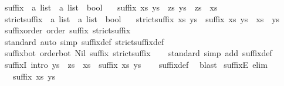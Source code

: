 \begin{isabellebody}
\ suffix\ {\isacharcolon}{\isacharcolon}\ {\isachardoublequoteopen}{\isacharprime}a\ list\ {\isasymRightarrow}\ {\isacharprime}a\ list\ {\isasymRightarrow}\ bool{\isachardoublequoteclose}\isanewline
\ \ \ {\isachardoublequoteopen}suffix\ xs\ ys\ {\isacharequal}\ {\isacharparenleft}{\isasymexists}zs{\isachardot}\ ys\ {\isacharequal}\ zs\ {\isacharat}\ xs{\isacharparenright}{\isachardoublequoteclose}\isanewline
\isanewline
{}\isamarkupfalse%
\ strict{\isacharunderscore}suffix\ {\isacharcolon}{\isacharcolon}\ {\isachardoublequoteopen}{\isacharprime}a\ list\ {\isasymRightarrow}\ {\isacharprime}a\ list\ {\isasymRightarrow}\ bool{\isachardoublequoteclose}\isanewline
\ \ \ {\isachardoublequoteopen}strict{\isacharunderscore}suffix\ xs\ ys\ {\isasymlongleftrightarrow}\ suffix\ xs\ ys\ {\isasymand}\ xs\ {\isasymnoteq}\ ys{\isachardoublequoteclose}\isanewline
\isanewline
{}\isamarkupfalse%
\ suffix{\isacharunderscore}order{\isacharcolon}\ order\ suffix\ strict{\isacharunderscore}suffix\isanewline
%
\isadelimproof
\ \ %
\endisadelimproof
%
\isatagproof
{}\isamarkupfalse%
\ standard\ {\isacharparenleft}auto\ simp{\isacharcolon}\ suffix{\isacharunderscore}def\ strict{\isacharunderscore}suffix{\isacharunderscore}def{\isacharparenright}%
\endisatagproof
{\isafoldproof}%
%
\isadelimproof
\isanewline
%
\endisadelimproof
\isanewline
{}\isamarkupfalse%
\ suffix{\isacharunderscore}bot{\isacharcolon}\ order{\isacharunderscore}bot\ Nil\ suffix\ strict{\isacharunderscore}suffix\isanewline
%
\isadelimproof
\ \ %
\endisadelimproof
%
\isatagproof
{}\isamarkupfalse%
\ standard\ {\isacharparenleft}simp\ add{\isacharcolon}\ suffix{\isacharunderscore}def{\isacharparenright}%
\endisatagproof
{\isafoldproof}%
%
\isadelimproof
\isanewline
%
\endisadelimproof
\isanewline
{}\isamarkupfalse%
\ suffixI\ {\isacharbrackleft}intro{\isacharquery}{\isacharbrackright}{\isacharcolon}\ {\isachardoublequoteopen}ys\ {\isacharequal}\ zs\ {\isacharat}\ xs\ {\isasymLongrightarrow}\ suffix\ xs\ ys{\isachardoublequoteclose}\isanewline
%
\isadelimproof
\ \ %
\endisadelimproof
%
\isatagproof
{}\isamarkupfalse%
\ suffix{\isacharunderscore}def\ \isamarkupfalse%
\ blast%
\endisatagproof
{\isafoldproof}%
%
\isadelimproof
\isanewline
%
\endisadelimproof
\isanewline
{}\isamarkupfalse%
\ suffixE\ {\isacharbrackleft}elim{\isacharquery}{\isacharbrackright}{\isacharcolon}\isanewline
\ \ \ {\isachardoublequoteopen}suffix\ xs\ ys{\isachardoublequoteclose}\isanewline

\end{isabellebody}
